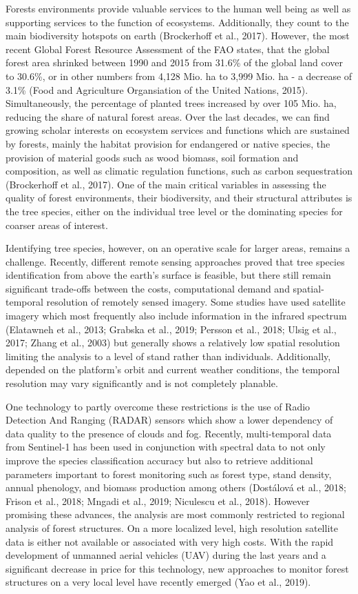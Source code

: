 \documentclass[]{article}
\begin{document}
Forests environments provide valuable services to the human well being
as well as supporting services to the function of ecosystems.
Additionally, they count to the main biodiversity hotspots on earth
(Brockerhoff et al., 2017). However, the most recent Global Forest
Resource Assessment of the FAO states, that the global forest area
shrinked between 1990 and 2015 from 31.6\% of the global land cover to
30.6\%, or in other numbers from 4,128 Mio. ha to 3,999 Mio. ha - a
decrease of 3.1\% (Food and Agriculture Organsiation of the United
Nations, 2015). Simultaneously, the percentage of planted trees
increased by over 105 Mio. ha, reducing the share of natural forest
areas. Over the last decades, we can find growing scholar interests on
ecosystem services and functions which are sustained by forests, mainly
the habitat provision for endangered or native species, the provision of
material goods such as wood biomass, soil formation and composition, as
well as climatic regulation functions, such as carbon sequestration
(Brockerhoff et al., 2017). One of the main critical variables in
assessing the quality of forest environments, their biodiversity, and
their structural attributes is the tree species, either on the
individual tree level or the dominating species for coarser areas of
interest.

Identifying tree species, however, on an operative scale for larger
areas, remains a challenge. Recently, different remote sensing
approaches proved that tree species identification from above the
earth's surface is feasible, but there still remain significant
trade-offs between the costs, computational demand and spatial-temporal
resolution of remotely sensed imagery. Some studies have used satellite
imagery which most frequently also include information in the infrared
spectrum (Elatawneh et al., 2013; Grabska et al., 2019; Persson et al.,
2018; Ulsig et al., 2017; Zhang et al., 2003) but generally shows a
relatively low spatial resolution limiting the analysis to a level of
stand rather than individuals. Additionally, depended on the platform's
orbit and current weather conditions, the temporal resolution may vary
significantly and is not completely planable.

One technology to partly overcome these restrictions is the use of Radio
Detection And Ranging (RADAR) sensors which show a lower dependency of
data quality to the presence of clouds and fog. Recently, multi-temporal
data from Sentinel-1 has been used in conjunction with spectral data to
not only improve the species classification accuracy but also to
retrieve additional parameters important to forest monitoring such as
forest type, stand density, annual phenology, and biomass production
among others (Dostálová et al., 2018; Frison et al., 2018; Mngadi et
al., 2019; Niculescu et al., 2018). However promising these advances,
the analysis are most commonly restricted to regional analysis of forest
structures. On a more localized level, high resolution satellite data is
either not available or associated with very high costs. With the rapid
development of unmanned aerial vehicles (UAV) during the last years and
a significant decrease in price for this technology, new approaches to
monitor forest structures on a very local level have recently emerged
(Yao et al., 2019).
\end{document}
